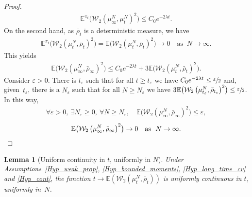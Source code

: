 \documentclass[10pt]{amsart}
\let\epsilon\varepsilon
\theoremstyle{plain}
\newtheorem{lemma}{Lemma}[section]
\theoremstyle{definition}
\begin{document}
\begin{proof}
\begin{align*}
\mathbb{E}^{\pi_t}\bigl(\mathcal{W}_2\left(\mu^N_{\infty},\mu^N_{t}\right)^2\bigr)\leq C_0e^{-2\lambda t}.
\end{align*}
On the second hand, as $\bar{\rho}_{t}$ is a deterministic measure, we have
\begin{align*}
\mathbb{E}^{\pi_t}\bigl(\mathcal{W}_2\left(\mu^N_{t},\bar{\rho}_{t}\right)^2\bigr)=\mathbb{E}\bigl(\mathcal{W}_2\left(\mu^N_{t},\bar{\rho}_{t}\right)^2\bigr)\to 0\quad\text{as }\ N\to\infty.
\end{align*}
This yields
\begin{align*}
\mathbb{E}\bigl(\mathcal{W}_2\left(\mu^N_{\infty},\bar{\rho}_{\infty}\right)^2\bigr)\leq C_0e^{-2\lambda t}+3\mathbb{E}\bigl(\mathcal{W}_2\left(\mu^N_{t},\bar{\rho}_{t}\right)^2\bigr).
\end{align*}
Consider $\epsilon>0$. There is $t_\epsilon$ such that for all $t\geq t_\epsilon$ we have $C_0e^{-2\lambda t}\leq\sfrac{\epsilon}{2}$ and, given~$t_\epsilon$, there is a $N_\epsilon$ such that for all $N\geq N_\epsilon$ we have ${3\mathbb{E}\bigl(\mathcal{W}_2\left(\mu^{N}_{t_\epsilon},\bar{\rho}_{t_\epsilon} \right)^2 \bigr)\leq\sfrac{\epsilon}{2}}$. In this way,
\begin{align*}
\forall \epsilon >0,\ \exists N_\epsilon \geq0,\ \forall N\geq N_\epsilon,\quad \mathbb{E}\bigl(\mathcal{W}_2\left(\mu^N_{\infty},\bar{\rho}_{\infty} \right)^2 \bigr)\leq\epsilon,
\end{align*}
\ie
\[
\mathbb{E}\bigl(\mathcal{W}_2\left(\mu^N_{\infty},\bar{\rho}_{\infty}\right)^2\bigr)\to 0\quad\text{as }\ N\to\infty.\qedhere
\]
\end{proof}

\begin{lemma}[Uniform continuity in $t$, uniformly in $N$]\label{cont_unif}
Under Assumptions~\ref{Hyp_weak_prop}, \ref{Hyp_bounded_moments}, \ref{Hyp_long_time_cv} and \ref{Hyp_cont}, the function $t\!\to\!\mathbb{E}\left(\mathcal{W}_2\left(\mu^N_{t},\bar{\rho}_{t}\right)\right)$ is uniformly continuous in $t$, uniformly in~$N$.
\end{lemma}
\end{document}
